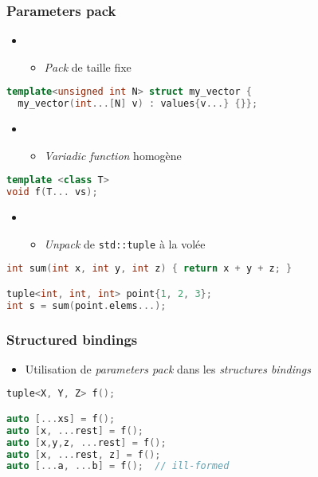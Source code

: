 \documentclass[C++.tex]{subfiles}
\begin{document}
\begin{frame}[fragile]
	\frametitle{Parameters pack}
	\begin{itemize}
		\item []
		\begin{itemize}
			\item \textit{Pack} de taille fixe
		\end{itemize}
	\end{itemize}

	\begin{lstlisting}[language=C++]
template<unsigned int N> struct my_vector {
  my_vector(int...[N] v) : values{v...} {}};\end{lstlisting}

	\begin{itemize}
		\item [] 
		\begin{itemize}
			\item \textit{Variadic function} homogène
		\end{itemize}
	\end{itemize}

	\begin{lstlisting}[language=C++]
template <class T>
void f(T... vs);\end{lstlisting}


	\begin{itemize}
		\item [] 
		\begin{itemize}
			\item \textit{Unpack} de \lstinline|std::tuple| à la volée
		\end{itemize}
	\end{itemize}

	\begin{lstlisting}[language=C++]
int sum(int x, int y, int z) { return x + y + z; }

tuple<int, int, int> point{1, 2, 3};
int s = sum(point.elems...);\end{lstlisting}
\end{frame}

\begin{frame}[fragile]
	\frametitle{Structured bindings}
	\begin{itemize}
		\item Utilisation de \textit{parameters pack} dans les \textit{structures bindings}
	\end{itemize}

	\begin{lstlisting}[language=C++]
tuple<X, Y, Z> f();

auto [...xs] = f();
auto [x, ...rest] = f();
auto [x,y,z, ...rest] = f();
auto [x, ...rest, z] = f();
auto [...a, ...b] = f();  // ill-formed\end{lstlisting}
\end{frame}
\end{document}
